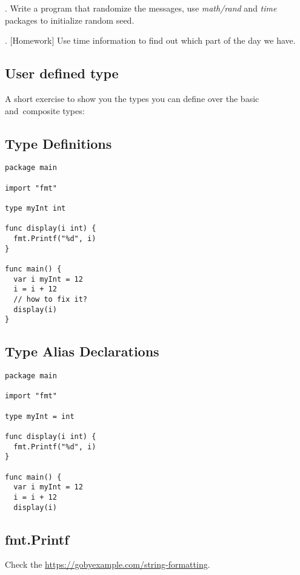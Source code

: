 \documentclass[11pt, letterpaper]{article}
\begin{document}
. Write a program that randomize the messages, use \emph{math/rand} and \emph{time} packages to initialize random seed.

. [Homework] Use time information to find out which part of the day we have.

\subsection{User defined type}

A short exercise to show you the types you can define over the basic and~composite types:

\subsection{Type Definitions}

\begin{verbatim}
package main

import "fmt"

type myInt int

func display(i int) {
  fmt.Printf("%d", i)
}

func main() {
  var i myInt = 12
  i = i + 12
  // how to fix it?
  display(i)
}
\end{verbatim}

\subsection{Type Alias Declarations}

\begin{verbatim}
package main

import "fmt"

type myInt = int

func display(i int) {
  fmt.Printf("%d", i)
}

func main() {
  var i myInt = 12
  i = i + 12
  display(i)
\end{verbatim}

\subsection{fmt.Printf}

Check the \href{golangbyexample}{https://gobyexample.com/string-formatting}.
\end{document}
